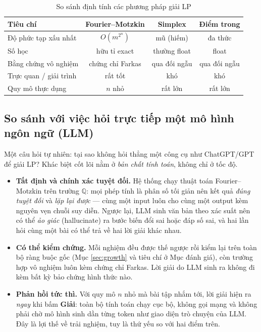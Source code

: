 \documentclass[12pt,a4paper]{article}
\theoremstyle{definition}
\newcommand{\Q}{\mathbb{Q}}
\begin{document}
\begin{table}[H]
\centering
\caption{So sánh định tính các phương pháp giải LP}
\label{tab:compare}
\begin{tabular}{lccc}
\toprule
\textbf{Tiêu chí} & \textbf{Fourier--Motzkin} & \textbf{Simplex} & \textbf{Điểm trong} \\
\midrule
Độ phức tạp xấu nhất & $O(m^{2^n})$ & mũ (hiếm) & đa thức \\
Số học & hữu tỉ exact & thường float & float \\
Bằng chứng vô nghiệm & chứng chỉ Farkas & qua đối ngẫu & qua đối ngẫu \\
Trực quan / giải trình & rất tốt & khó & khó \\
Quy mô thực dụng & $n$ nhỏ & rất lớn & rất lớn \\
\bottomrule
\end{tabular}
\end{table}

\subsection{So sánh với việc hỏi trực tiếp một mô hình ngôn ngữ (LLM)}
\label{sec:vs-llm}

Một câu hỏi tự nhiên: tại sao không hỏi thẳng một công cụ như ChatGPT/GPT để
giải LP? Khác biệt cốt lõi nằm ở \emph{bản chất tính toán}, không chỉ ở tốc độ.

\begin{itemize}
    \item \textbf{Tất định và chính xác tuyệt đối.} Hệ thống chạy thuật toán
          Fourier--Motzkin trên trường $\Q$: mọi phép tính là phân số tối giản
          nên kết quả \emph{đúng tuyệt đối} và \emph{lặp lại được} --- cùng một
          input luôn cho cùng một output kèm nguyên vẹn chuỗi suy diễn. Ngược
          lại, LLM sinh văn bản theo xác suất nên có thể \emph{ảo giác}
          (hallucinate) ra bước biến đổi sai hoặc đáp số sai, và hai lần hỏi cùng
          một bài có thể trả về hai lời giải khác nhau.
    \item \textbf{Có thể kiểm chứng.} Mỗi nghiệm đều được thế ngược rồi kiểm lại
          trên toàn bộ ràng buộc gốc (Mục \ref{sec:growth} và tiêu chí ở Mục
          đánh giá), còn trường hợp vô nghiệm luôn kèm chứng chỉ Farkas. Lời giải
          do LLM sinh ra không đi kèm bất kỳ bảo chứng hình thức nào.
    \item \textbf{Phản hồi tức thì.} Với quy mô $n$ nhỏ mà bài tập nhắm tới, lời
          giải hiện ra \emph{ngay} khi bấm \textbf{Giải}: toàn bộ tính toán chạy
          cục bộ, không gọi mạng và không phải chờ mô hình sinh dần từng token
          như giao diện trò chuyện của LLM. Đây là lợi thế về trải nghiệm, tuy là
          thứ yếu so với hai điểm trên.
\end{itemize}
\end{document}
